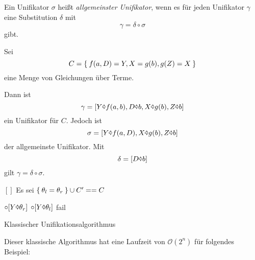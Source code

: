 \begin{definition}%
    Ein Unifikator $\sigma$ heißt \textit{allgemeinster Unifikator}, wenn
    es für jeden Unifikator $\gamma$ eine Substitution $\delta$ mit
    \[\gamma = \delta \circ \sigma\]
    gibt.
\end{definition}

\begin{beispiel}
    Sei
    \[C = \Set{f(a,D) = Y, X = g(b), g(Z) = X}\]
    eine Menge von Gleichungen über Terme.

    Dann ist
    \[\gamma = [Y \text{\pointer} f(a,b), D \text{\pointer} b, X \text{\pointer} g(b), Z \text{\pointer} b]\]
    ein Unifikator für $C$. Jedoch ist
    \[\sigma = [Y \text{\pointer} f(a,D), X \text{\pointer} g(b), Z \text{\pointer} b]\]
    der allgemeinste Unifikator. Mit
    \[\delta = [D \text{\pointer} b]\]
    gilt $\gamma = \delta \circ \sigma$.
\end{beispiel}

\begin{algorithm}[h]
    \begin{algorithmic}
            \State \Return $[]$
        \Else
            \State Es sei $\Set{\theta_l = \theta_r} \cup C' == C$

                \State {}
                \State {} $\circ [Y \text{\pointer} \theta_r]$
                \State {} $\circ [Y \text{\pointer} \theta_l]$
                \State {}
            \Else
                \State fail
            \EndIf
        \EndIf
        \EndFunction
    \end{algorithmic}
\caption{Klassischer Unifikationsalgorithmus}
\label{alg:klassischer-unifikationsalgorithmus}
\end{algorithm}

Dieser klassische Algorithmus hat eine Laufzeit von $\mathcal{O}(2^n)$ für folgendes
Beispiel:

